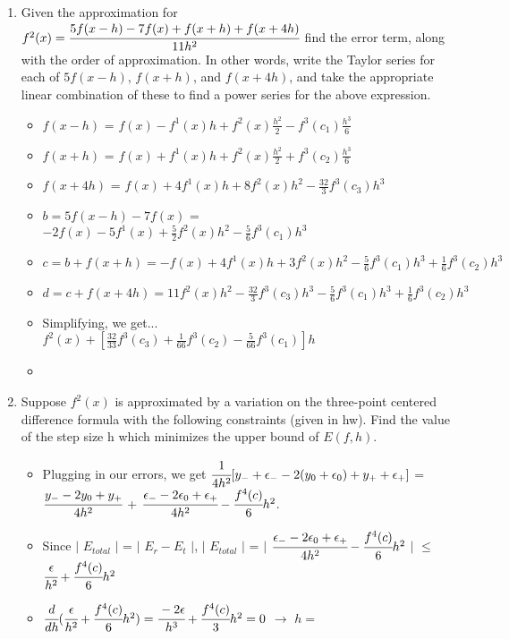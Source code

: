 \documentclass[12pt]{article}
\begin{document}
\begin{enumerate}

	\item Given the approximation for $f^{2}(x) = \cfrac{5f(x-h)-7f(x)+f(x+h)+f(x+4h)}{11h^2}$ find the error term, along with the order of approximation. In other words, write the Taylor series for each of $5f(x-h)$, $f(x+h)$, and $f(x+4h)$, and take the appropriate linear combination of these to find a power series for the above expression.
	\begin{itemize}
		\item $f(x-h)$ = $f(x) - f^1(x)h + f^2(x)\frac{h^2}{2} - f^3(c_1)\frac{h^3}{6}$
		\item $f(x+h)$ = $f(x) + f^1(x)h + f^2(x)\frac{h^2}{2} + f^3(c_2)\frac{h^3}{6}$
		\item $f(x+4h)$ = $f(x) + 4f^1(x)h + 8f^2(x)h^2 - \frac{32}{3}f^3(c_3)h^3$
		\item $b = 5f(x-h)-7f(x)$ = $-2f(x) - 5f^1(x) + \frac{5}{2}f^2(x)h^2 - \frac{5}{6}f^3(c_1)h^3$
		\item $c = b+f(x+h) = -f(x) + 4f^1(x)h+3f^2(x)h^2-\frac{5}{6}f^3(c_1)h^3 + \frac{1}{6}f^3(c_2)h^3$ 
		\item $d = c+f(x+4h) = 11f^2(x)h^2-\frac{32}{3}f^3(c_3)h^3 -\frac{5}{6}f^3(c_1)h^3 + \frac{1}{6}f^3(c_2)h^3$ 
		\item Simplifying, we get... \\
		$f^2(x) + [\frac{32}{33}f^3(c_3) + \frac{1}{66}f^3(c_2) -\frac{5}{66}f^3(c_1)]h$
		\item {}
	\end{itemize}
	
	\item Suppose $f^2(x)$ is approximated by a variation on the three-point centered difference formula with the following constraints (given in hw). Find the value of the step size h which minimizes the upper bound of $E(f,h)$.
	\begin{itemize}
		\item Plugging in our errors, we get $\cfrac{1}{4h^2}[y_- + \epsilon_- - 2(y_0 + \epsilon_0) + y_+ + \epsilon_+]$ = \\
$\cfrac{y_- - 2y_0 + y_+}{4h^2}$ + $\cfrac{\epsilon_- - 2\epsilon_0 + \epsilon_+}{4h^2} - \cfrac{f^4(c)}{6}h^2$. 
	\item Since $|$ $E_{total}$ $|$ = $|$ $E_r - E_t$ $|$,  $|$ $E_{total}$ $|$ = $|$ $\cfrac{\epsilon_- - 2\epsilon_0 + \epsilon_+}{4h^2} - \cfrac{f^4(c)}{6}h^2$ $|$ $\leq$ $\cfrac{\epsilon}{h^2} + \cfrac{f^4(c)}{6}h^2$
	\item $\cfrac{d}{dh}(\cfrac{\epsilon}{h^2} + \cfrac{f^4(c)}{6}h^2) = \cfrac{-2\epsilon}{h^3} + \cfrac{f^4(c)}{3}h^2 = 0$ $\rightarrow$ $h =$ 	
	\end{itemize}
	

\end{enumerate}
\end{document}
